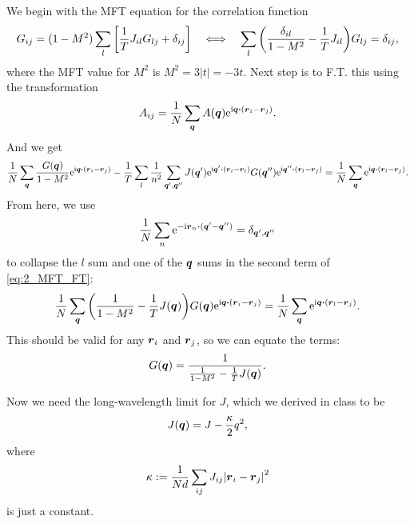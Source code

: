 \documentclass[11pt,letter, swedish, english
]{article}
\begin{document}
We begin with the MFT equation for the correlation function
\begin{equation}
G_{ij}=(1-M^2)\sum_l \qty[\frac{1}{T}J_{il}G_{lj}+\delta_{ij}]
\quad\Longleftrightarrow\quad
\sum_l\qty(\frac{\delta_{il}}{1-M^2}-\frac{1}{T}J_{il})G_{lj}
=\delta_{ij},
\end{equation}
where the MFT value for $M^2$ is $M^2=3|t|=-3t$.
Next step is to F.T. this using the transformation
\begin{equation}
A_{ij}=\frac{1}{N}\sum_{\vb*q} A(\vb*q)\ee^{\ii\vb*q\vdot(\vb*r_i-\vb*r_j)}.
\end{equation}
And we get
\begin{equation}\label{eq:2_MFT_FT}
\frac{1}{N}\sum_{\vb*q} \frac{G(\vb*q)}{1-M^2}
\ee^{\ii\vb*q\vdot(\vb*r_i-\vb*r_j)}
-\frac{1}{T}\sum_l\frac{1}{n^2}\sum_{\vb*q', \vb*q''}
J(\vb*q')\ee^{\ii\vb*q'\vdot(\vb*r_i-\vb*r_l)}
G(\vb*q'')\ee^{\ii\vb*q''\vdot(\vb*r_l-\vb*r_j)}
=\frac{1}{N}\sum_{\vb*q}\ee^{\ii\vb*q\vdot(\vb*r_l-\vb*r_j)}.
\end{equation}
From here, we use 
\begin{equation}
\frac{1}{N}\sum_n\ee^{-\ii \vb*r_n\vdot(\vb*q'-\vb*q'')}=\delta_{\vb*q', \vb*q''}
\end{equation}
to collapse the $l$ sum and one of the $\vb*q$ sums in the second term
of \eqref{eq:2_MFT_FT}:
\begin{equation}
\frac{1}{N}\sum_{\vb*q} 
\qty(\frac{1}{1-M^2} -\frac{1}{T}J(\vb*q))G(\vb*q)
\ee^{\ii\vb*q\vdot(\vb*r_i-\vb*r_j)}
=\frac{1}{N}\sum_{\vb*q}\ee^{\ii\vb*q\vdot(\vb*r_l-\vb*r_j)}.
\end{equation}
This should be valid for any $\vb*r_i$ and $\vb*r_j$, so we can equate
the terms:
\begin{equation}
G(\vb*q)=\frac{1}{\frac{1}{1-M^2} -\frac{1}{T}J(\vb*q)}.
\end{equation}

Now we need the long-wavelength limit for $J$, which we derived in
class to be
\begin{equation}
J(\vb*q)=J-\frac{\kappa}{2}q^2,
\end{equation}
where 
\begin{equation}
\kappa:=\frac{1}{Nd}\sum_{ij}J_{ij}\abs{\vb*r_i-\vb*r_j}^2
\end{equation}
is just a constant. 
\end{document}
